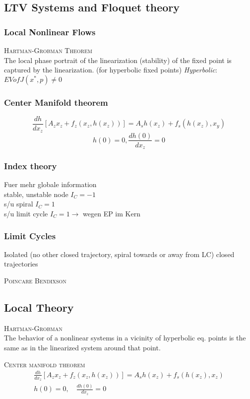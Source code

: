 \subsection{LTV Systems and Floquet theory}

\subsubsection{Local Nonlinear Flows}
\textsc{Hartman-Grobman Theorem}\\
The local phase portrait of the linearization (stability) of the fixed point is captured by the linearization. (for hyperbolic fixed points)
\emph{Hyperbolic}: $EV of J(x^*,p) \neq 0$

\subsubsection{Center Manifold theorem}
\[ \frac{dh}{dx_z} [A_z x_z + f_z(x_z,h(x_z))] = A_s h(x_z) + f_s(h(x_z),x_y) \]
\[ h(0) = 0, \frac{dh(0)}{dx_z} = 0 \]

\subsubsection{Index theory}
Fuer mehr globale information\\
stable, unstable node $I_C = -1$\\
s/u spiral $I_C = 1$\\
s/u limit cycle $I_C = 1 \rightarrow$ wegen EP im Kern
\subsubsection{Limit Cycles}
Isolated (no other closed trajectory, spiral towards or away from LC) closed trajectories

\textsc{Poincare Bendixson}\\
\subsection{Local Theory}
\textsc{Hartman-Grobman}\\
The behavior of a nonlinear systems in a vicinity of hyperbolic eq. points is the same as in the linearized system around that point.

\textsc{Center manifold theorem}\\
\begin{align*}
\frac{dh}{dx_z}[A_zx_z+f_z(x_z, h(x_z))] = A_sh(x_z)+f_s(h(x_z),x_z) \\
h(0)=0, \quad \frac{dh(0)}{dx_z} = 0
\end{align*}


